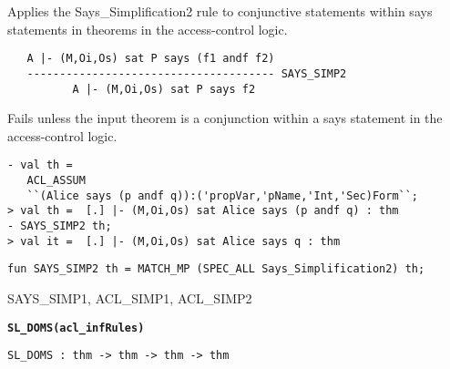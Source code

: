 \SYNOPSIS
Applies the Says_Simplification2 rule to conjunctive statements within
says statements in theorems in the access-control logic.

\DESCRIBE
\begin{verbatim}
   A |- (M,Oi,Os) sat P says (f1 andf f2)
   -------------------------------------- SAYS_SIMP2
          A |- (M,Oi,Os) sat P says f2
\end{verbatim}

\FAILURE
Fails unless the input theorem is a conjunction within a
says statement in the access-control logic.

\EXAMPLE
\begin{holboxed}
\begin{verbatim}
- val th = 
   ACL_ASSUM 
   ``(Alice says (p andf q)):('propVar,'pName,'Int,'Sec)Form``;
> val th =  [.] |- (M,Oi,Os) sat Alice says (p andf q) : thm
- SAYS_SIMP2 th;
> val it =  [.] |- (M,Oi,Os) sat Alice says q : thm
\end{verbatim}
\end{holboxed}

\IMPLEMENTATION
\begin{holboxed}
\begin{verbatim}
fun SAYS_SIMP2 th = MATCH_MP (SPEC_ALL Says_Simplification2) th;
\end{verbatim}
\end{holboxed}

\SEEALSO
SAYS\_SIMP1, ACL\_SIMP1, ACL\_SIMP2
\ENDDOC

\begin{holboxed}
  \begin{Large}
    \textbf{\texttt{SL\_DOMS}}\hfill{}\textbf{\texttt{(acl\_infRules)}}
  \end{Large}
\end{holboxed}

\begin{verbatim}
SL_DOMS : thm -> thm -> thm -> thm
\end{verbatim}

